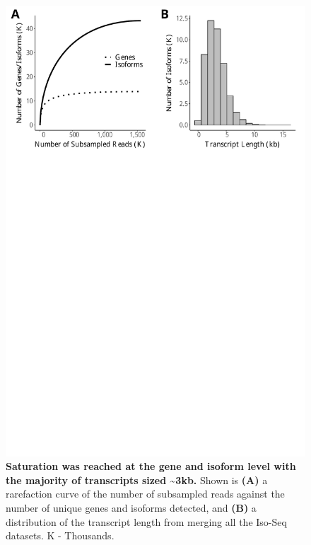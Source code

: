 \vspace{1cm}
\begin{figure}[!h]
	\begin{center}
		\includegraphics[page=1,trim={0 26cm 0 0},clip,scale = 0.55]{Figures/IsoSeqWholeTranscriptome.pdf}
	\end{center}
	\captionsetup{width=0.95\textwidth}
	\caption[Rarefaction curves from global transcriptome profiling of the rTg4510 cortex]%
	{\textbf{Saturation was reached at the gene and isoform level with the majority of transcripts sized \textasciitilde3kb.} Shown is \textbf{(A)} a rarefaction curve of the number of subsampled reads against the number of unique genes and isoforms detected, and \textbf{(B)} a distribution of the transcript length from merging all the Iso-Seq datasets. K - Thousands.}
	\label{fig:isoseq_whole_rarefaction}
\end{figure}


